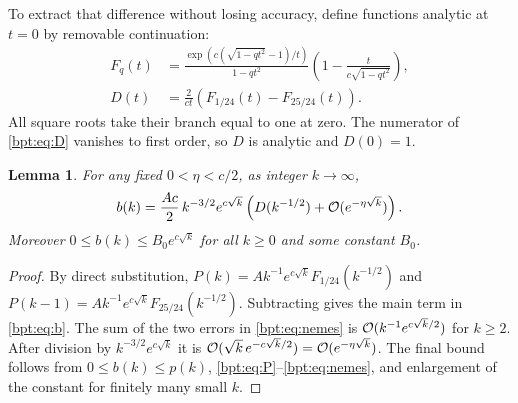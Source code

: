 \documentclass[11pt]{article}
\newtheorem{lemma}[theorem]{Lemma}
\theoremstyle{remark}\newtheorem{remark}[theorem]{Remark}
\begin{document}
To extract that difference without losing accuracy, define functions analytic at $t=0$ by removable continuation:
\begin{align}
 F_q(t)&=\frac{\exp\!\left(c(\sqrt{1-qt^2}-1)/t\right)}{1-qt^2}
     \left(1-\frac{t}{c\sqrt{1-qt^2}}\right),\label{bpt:eq:F}\\
 D(t)&=\frac{2}{ct}\left(F_{1/24}(t)-F_{25/24}(t)\right).
 \label{bpt:eq:D}
\end{align}
All square roots take their branch equal to one at zero. The numerator of \eqref{bpt:eq:D} vanishes to first order, so $D$ is analytic and $D(0)=1$.

\begin{lemma}\label{bpt:lem:b}
For any fixed $0<\eta<c/2$, as integer $k\to\infty$,
\begin{equation}\label{bpt:eq:b}
 b(k)=\frac{Ac}{2}\,k^{-3/2}e^{c\sqrt k}
        \left(D(k^{-1/2})+\mathcal O(e^{-\eta\sqrt k})\right).
\end{equation}
Moreover $0\le b(k)\le B_0e^{c\sqrt k}$ for all $k\ge0$ and some constant $B_0$.
\end{lemma}
\begin{proof}
By direct substitution, $P(k)=Ak^{-1}e^{c\sqrt k}F_{1/24}(k^{-1/2})$ and
$P(k-1)=Ak^{-1}e^{c\sqrt k}F_{25/24}(k^{-1/2})$.
Subtracting gives the main term in \eqref{bpt:eq:b}. The sum of the two errors in \eqref{bpt:eq:nemes} is $\mathcal O(k^{-1}e^{c\sqrt k/2})$ for $k\ge2$.
After division by $k^{-3/2}e^{c\sqrt k}$ it is
$\mathcal O(\sqrt k\,e^{-c\sqrt k/2})=\mathcal O(e^{-\eta\sqrt k})$.
The final bound follows from $0\le b(k)\le p(k)$, \eqref{bpt:eq:P}--\eqref{bpt:eq:nemes}, and enlargement of the constant for finitely many small $k$.
\end{proof}
\end{document}
